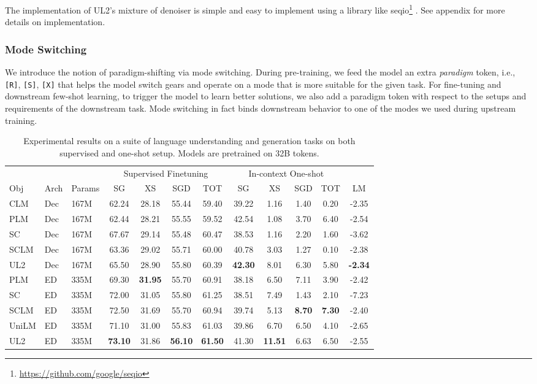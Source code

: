 \documentclass[10pt]{article}
\begin{document}
The implementation of UL2's mixture of denoiser is simple and easy to implement using a library like seqio\footnote{\url{https://github.com/google/seqio}} \citep{https://doi.org/10.48550/arxiv.2203.17189}. See appendix for more details on implementation.



\subsubsection{Mode Switching}
We introduce the notion of paradigm-shifting via mode switching. During pre-training, we feed the model an extra \emph{paradigm} token, i.e., \texttt{[R]}, \texttt{[S]}, \texttt{[X]} that helps the model switch gears and operate on a mode that is more suitable for the given task. For fine-tuning and downstream few-shot learning, to trigger the model to learn better solutions, we also add a paradigm token with respect to the setups and requirements of the downstream task. Mode switching in fact binds downstream behavior to one of the modes we used during upstream training. 
\begin{table*}[]
    \centering
    \small
    \caption{Experimental results on a suite of language understanding and generation tasks on both supervised and one-shot setup. Models are pretrained on 32B tokens.}
\label{tab:raw_scores}
    \begin{tabular}{lllccccccccc}
    \toprule
        & & &\multicolumn{4}{c}{Supervised Finetuning} & \multicolumn{4}{c}{In-context One-shot}\\
        Obj &  Arch &  Params &SG & XS & SGD & TOT & SG & XS & SGD & TOT   & LM  \\
        \midrule
  CLM       & Dec & 167M & 62.24 & 	28.18& 	55.44 & 	59.40 & 	39.22	&  1.16 & 	1.40 & 	0.20 & 	-2.35 \\ 
  PLM & Dec & 167M  & 62.44 &	28.21 &	55.55 &	59.52 &	42.54 &	1.08 & 	3.70	& 6.40 &	-2.54\\
  SC & Dec & 167M  &67.67 &	29.14	& 55.48 	& 	60.47 	& 	38.53 	& 	1.16 	& 	2.20 	& 	1.60 	& 	-3.62 \\ 
  SCLM & Dec & 167M & 63.36 &	29.02 &	55.71 &	60.00 &	40.78 &	3.03 &	1.27 &	0.10 &	-2.38	 \\
  UL2 & Dec & 167M &  65.50	& 28.90	 &  55.80 & 	60.39 & 	\textbf{42.30} & 	8.01 & 	6.30 & 	5.80 & 	\textbf{-2.34} \\
  \midrule 
  PLM & ED & 335M & 69.30	& \textbf{31.95} & 	55.70& 	60.91& 	38.18& 	6.50& 	7.11& 	3.90& 	-2.42 \\ 
  SC & ED & 335M &  72.00	&  31.05 & 	55.80 & 	61.25 & 	38.51 & 	7.49 & 	1.43 & 	2.10 & 	-7.23 \\
  SCLM & ED &  335M & 72.50	 & 31.69 &	55.70 &	60.94 &	39.74 &	5.13&	\textbf{8.70}&	\textbf{7.30}&	-2.40 \\
  UniLM & ED &  335M &  71.10 &	31.00 &	55.83 &	61.03 &	39.86 &	6.70	&6.50&	4.10&	-2.65 \\
  UL2 & ED & 335M &  \textbf{73.10} &	31.86&	\textbf{56.10}&	\textbf{61.50}&	41.30&	\textbf{11.51}&	6.63	&6.50	& -2.55\\ 
  \bottomrule 
    \end{tabular}
    
\end{table*}
\end{document}
